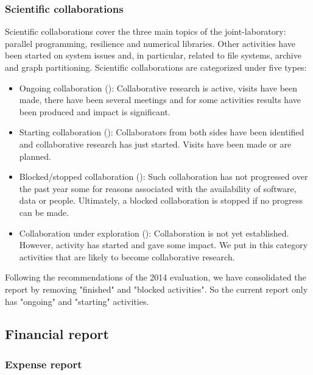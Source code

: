 \documentclass[12pt]{article}
\newcommand{\ema}[1]{\ensuremath{#1}\xspace}
\newcommand{\ongoing}{{\Large \color{darkgreen}{\ema{\rightrightarrows}}\xspace}}
\newcommand{\starting}{{\Large \color{green}{\ema{| \hspace*{-0.3cm}\rightrightarrows}}\xspace}}
\newcommand{\finished}{{\Large \color{blue}{\ema{\rightrightarrows \hspace*{-0.3cm} |}}\xspace}}
\newcommand{\blocked}{{\Large \color{red}{\ema{\downdownarrows}}\xspace}}
\newcommand{\explore}{{\Large \color{magenta}{\ema{\upuparrows}}\xspace}}
\theoremstyle{definition}
\begin{document}
\subsubsection*{Scientific collaborations}

Scientific collaborations cover the three main topics of the joint-laboratory: parallel programming, resilience and numerical libraries. Other activities have been started on system issues and, in particular, related to file systems, archive and graph partitioning.
Scientific collaborations are categorized under five types:
\begin{itemize}
\item Ongoing collaboration (\ongoing): Collaborative research is active, visits have been made, there have been several meetings and for some activities results have been produced and impact is significant.
\item Starting collaboration (\starting): Collaborators from both sides have been identified and collaborative research has just started. Visits have been made or are planned. 
\item Blocked/stopped collaboration (\blocked): Such collaboration has not progressed over the past year some for reasons associated with the availability of software, data or people. Ultimately, a blocked collaboration is stopped if no progress can be made.
\item Collaboration under exploration (\explore): Collaboration is not yet established. However, activity has started and gave some impact. We put in this category activities that are likely to become collaborative research.
\end{itemize}

Following the recommendations of the 2014 evaluation, we have consolidated the report by removing "finished" and "blocked activities". So the current report only has "ongoing" and "starting" activities. 


\newpage








\newpage
\subsection{Financial report}
\subsubsection{Expense report}
%
\end{document}
